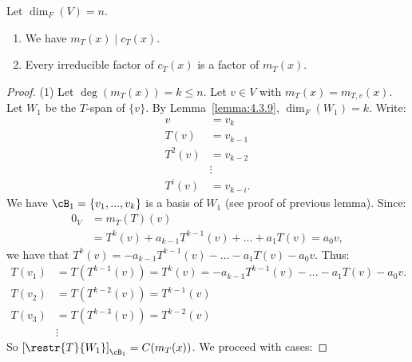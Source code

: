     \begin{theorem}
        Let $\dim_F(V) = n$.
        \begin{enumerate}[label = (\arabic*)]
            \item We have $m_T(x) \mid c_T(x)$.
            \item Every irreducible factor of $c_T(x)$ is a factor of $m_T(x)$.
        \end{enumerate}
    \end{theorem}
        \begin{proof}
            (1) Let $\deg(m_T(x)) = k \leq n$. Let $v \in V$ with $m_T(x) = m_{T,v}(x)$. Let $W_1$ be the $T$-span of $\{v\}$. By Lemma~\ref{lemma:4.3.9}, $\dim_F(W_1) = k$. Write:
                \begin{equation*}
                \begin{split}
                    v &= v_k \\
                    T(v) & = v_{k-1} \\
                    T^2(v) & = v_{k-2} \\
                    &\vdots \\
                    T^i(v) & = v_{k-i}.
                \end{split}
                \end{equation*}
            We have $\cB_1 = \{v_1,...,v_k\}$ is a basis of $W_1$ (see proof of previous lemma). Since:
                \begin{equation*}
                \begin{split}
                    0_V &= m_T(T)(v) \\
                    & = T^k(v) + a_{k-1}T^{k-1}(v) + ... + a_1T(v) = a_0 v,
                \end{split}
                \end{equation*}
            we have that $T^k(v) = -a_{k-1}T^{k-1}(v) - ... - a_1T(v) - a_0v$. Thus:
                \begin{equation*}
                \begin{split}
                    T(v_1) &= T(T^{k-1}(v)) = T^k(v) = -a_{k-1}T^{k-1}(v) - ... - a_1T(v) - a_0v.\\
                    T(v_2) & = T(T^{k-2}(v)) = T^{k-1}(v) \\
                    T(v_3) &= T(T^{k-3}(v)) = T^{k-2}(v) \\
                    &\vdots 
                \end{split}
                \end{equation*}
            So $\left[\restr{T}{W_1}\right]_{\cB_1} = C(m_T(x))$. We proceed with cases:
            

\end{proof}
